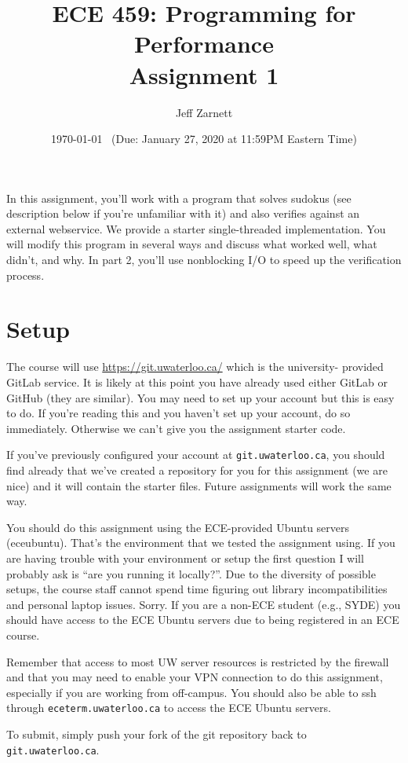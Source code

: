\documentclass[letterpaper,10pt]{article}
\title{\bf ECE 459: Programming for Performance\\Assignment 1}
\author{Jeff Zarnett}
\date{\today ~ (Due: January 27, 2020 at 11:59PM Eastern Time)}
\begin{document}
\maketitle

In this assignment, you'll work with a program that solves sudokus 
(see description below if you're unfamiliar with it) and 
also verifies against an external webservice. We provide a starter
single-threaded implementation. You will modify this program in several
ways and discuss what worked well, what didn't, and why.
In part 2, you'll use nonblocking I/O to speed up the verification process.

\section*{Setup}


The course will use \url{https://git.uwaterloo.ca/} which is the university-
provided GitLab service. It is likely at this point you have already used 
either GitLab or GitHub (they are similar). You may need to set up your 
account but this is easy to do. If you're reading this and you haven't set up 
your account, do so immediately. Otherwise we can't give you the assignment 
starter code.

If you've previously configured your account at {\tt git.uwaterloo.ca}, you 
should find already that we've created a repository for you for this 
assignment (we are nice) and it will contain the starter files. Future 
assignments will work the same way.

You should do this assignment using the ECE-provided Ubuntu servers 
(eceubuntu). That's the environment that we tested the
assignment using. If you are having trouble with your environment or setup
the first question I will probably ask is ``are you running it locally?''.
Due to the diversity of possible setups, the course staff cannot spend
time figuring out library incompatibilities and personal laptop issues.
Sorry. If you are a non-ECE student (e.g., SYDE) you should have
access to the ECE Ubuntu servers due to being registered in an ECE course.

Remember that access to most UW server resources is restricted by the firewall 
and that you may need to enable your VPN connection to do this assignment, 
especially if you are working from off-campus. You should also be able to ssh through
{\tt eceterm.uwaterloo.ca} to access the ECE Ubuntu servers.

To submit, simply push your fork of the git repository back to {\tt git.uwaterloo.ca}.
\end{document}
